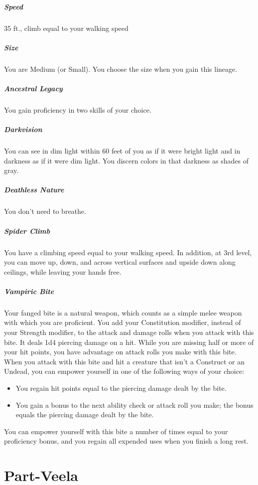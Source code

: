 \documentclass[a4paper,twocolumn,openany,nodeprecatedcode]{dndbook}
\begin{document}
        \subparagraph{Speed} 35 ft., climb equal to your walking speed

        \subparagraph{Size} You are Medium (or Small). You choose the size when you gain this lineage.

        \subparagraph{Ancestral Legacy} You gain proficiency in two skills of your choice.

        \subparagraph{Darkvision} You can see in dim light within 60 feet of you as if it were bright light and in darkness as if it were dim light. You discern colors in that darkness as shades of gray.

        \subparagraph{Deathless Nature} You don't need to breathe.

        \subparagraph{Spider Climb} You have a climbing speed equal to your walking speed. In addition, at 3rd level, you can move up, down, and across vertical surfaces and upside down along ceilings, while leaving your hands free.

        \subparagraph{Vampiric Bite} Your fanged bite is a natural weapon, which counts as a simple melee weapon with which you are proficient. You add your Constitution modifier, instead of your Strength modifier, to the attack and damage rolls when you attack with this bite. It deals 1d4 piercing damage on a hit. While you are missing half or more of your hit points, you have advantage on attack rolls you make with this bite.\\
        When you attack with this bite and hit a creature that isn't a Construct or an Undead, you can empower yourself in one of the following ways of your choice:

        \begin{itemize}
            \item You regain hit points equal to the piercing damage dealt by the bite.
            \item You gain a bonus to the next ability check or attack roll you make; the bonus equals the piercing damage dealt by the bite.
        \end{itemize}

        You can empower yourself with this bite a number of times equal to your proficiency bonus, and you regain all expended uses when you finish a long rest.


    \section{Part-Veela}
\end{document}
